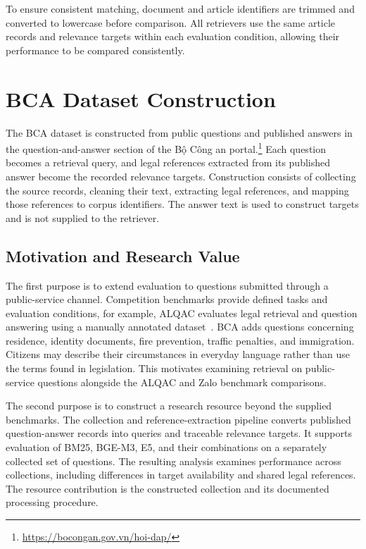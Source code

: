 To ensure consistent matching, document and article identifiers are trimmed and converted to lowercase before comparison. All retrievers use the same article records and relevance targets within each evaluation condition, allowing their performance to be compared consistently.

\section{BCA Dataset Construction}
\label{sec:bca-construction}

The BCA dataset is constructed from public questions and published answers in the question-and-answer section of the Bộ Công an portal.\footnote{\url{https://bocongan.gov.vn/hoi-dap/}} Each question becomes a retrieval query, and legal references extracted from its published answer become the recorded relevance targets. Construction consists of collecting the source records, cleaning their text, extracting legal references, and mapping those references to corpus identifiers. The answer text is used to construct targets and is not supplied to the retriever.

\subsection{Motivation and Research Value}

The first purpose is to extend evaluation to questions submitted through a public-service channel. Competition benchmarks provide defined tasks and evaluation conditions, for example, ALQAC evaluates legal retrieval and question answering using a manually annotated dataset~\cite{alqac2024}. BCA adds questions concerning residence, identity documents, fire prevention, traffic penalties, and immigration. Citizens may describe their circumstances in everyday language rather than use the terms found in legislation. This motivates examining retrieval on public-service questions alongside the ALQAC and Zalo benchmark comparisons.

The second purpose is to construct a research resource beyond the supplied benchmarks. The collection and reference-extraction pipeline converts published question-answer records into queries and traceable relevance targets. It supports evaluation of BM25, BGE-M3, E5, and their combinations on a separately collected set of questions. The resulting analysis examines performance across collections, including differences in target availability and shared legal references. The resource contribution is the constructed collection and its documented processing procedure.

